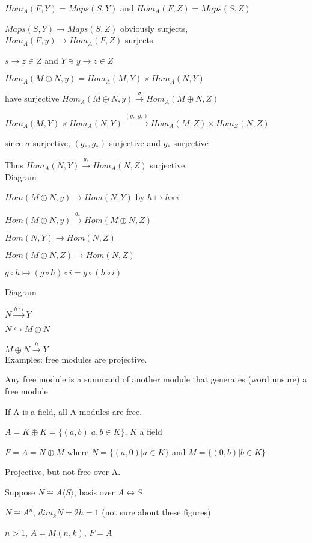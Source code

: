 \documentclass[12pt]{article}
\begin{document}
$Hom_A(F, Y) = Maps(S, Y)$ and $Hom_A(F, Z) = Maps(S, Z)$

$Maps(S, Y) \to Maps(S, Z)$ obviously surjects, $Hom_A(F, y) \to Hom_A(F, Z)$ surjects

$s \to z \in Z$ and $Y \ni y \to z \in Z$

$Hom_A(M \oplus N, y) = Hom_A(M, Y) \times Hom_A(N, Y)$

have surjective $Hom_A(M \oplus N, y) \xrightarrow{\sigma} Hom_A(M \oplus N, Z)$

$Hom_A(M, Y) \times Hom_A(N, Y) \xrightarrow{(g_*, g_*)} Hom_A(M, Z) \times Hom_Z(N, Z)$

since $\sigma$ surjective, $(g_*, g_*)$ surjective and $g_*$ surjective

Thus $Hom_A(N, Y) \xrightarrow{g_*} Hom_A(N, Z)$ surjective.\\

\noindent
Diagram

$Hom(M \oplus N, y) \to Hom(N, Y)$ by $h \mapsto h \circ i$

$Hom(M \oplus N, y) \xrightarrow{g_*} Hom(M \oplus N, Z)$

$Hom(N, Y) \to Hom(N, Z)$

$Hom(M \oplus N, Z) \to Hom(N, Z)$

$g \circ h \mapsto (g \circ h) \circ i = g \circ (h \circ i)$

\noindent
Diagram

$N \xrightarrow{h \circ i} Y$

$N \hookrightarrow M \oplus N$

$M \oplus N \xrightarrow{h} Y$\\

\noindent
Examples: free modules are projective.

Any free module is a summand of another module that generates (word unsure) a free module

If A is a field, all A-modules are free.

\noindent
$A = K \oplus K = \{(a, b) | a, b \in K\}$, $K$ a field

$F = A = N \oplus M$ where $N = \{(a, 0)| a \in K\}$ and $M = \{(0, b) | b \in K\}$

Projective, but not free over A.

Suppose $N \cong A\langle S\rangle$, basis over $A \leftrightarrow S$

$N \cong A^n$, $dim_kN = 2h = 1$ (not sure about these figures)

$n > 1$, $A = M(n, k)$, $F = A$
\end{document}
